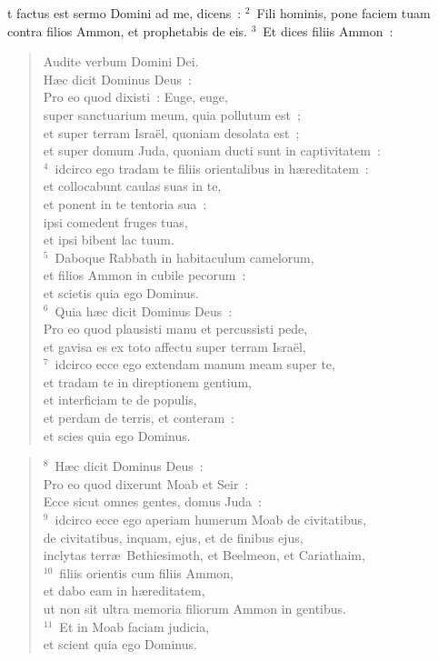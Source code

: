 \bchapter
{}t factus est sermo Domini ad me, dicens~:
${}^{2}$~Fili hominis, pone faciem tuam contra filios Ammon, et prophetabis de eis.
${}^{3}$~Et dices filiis Ammon~: \begin{flushleft}\begin{verse}Audite verbum Domini Dei.\\ H\ae c dicit Dominus Deus~:\\ Pro eo quod dixisti~: Euge, euge,\\ super sanctuarium meum, quia pollutum est~;\\ et super terram Isra\"el, quoniam desolata est~;\\ et super domum Juda, quoniam ducti sunt in captivitatem~:\\
${}^{4}$~idcirco ego tradam te filiis orientalibus in h\ae reditatem~:\\ et collocabunt caulas suas in te,\\ et ponent in te tentoria sua~:\\ ipsi comedent fruges tuas,\\ et ipsi bibent lac tuum.\\
${}^{5}$~Daboque Rabbath in habitaculum camelorum,\\ et filios Ammon in cubile pecorum~:\\ et scietis quia ego Dominus.\\
${}^{6}$~Quia h\ae c dicit Dominus Deus~:\\ Pro eo quod plausisti manu et percussisti pede,\\ et gavisa es ex toto affectu super terram Isra\"el,\\
${}^{7}$~idcirco ecce ego extendam manum meam super te,\\ et tradam te in direptionem gentium,\\ et interficiam te de populis,\\ et perdam de terris, et conteram~:\\ et scies quia ego Dominus.\end{verse}\end{flushleft}


\begin{flushleft}\begin{verse}${}^{8}$~H\ae c dicit Dominus Deus~:\\ Pro eo quod dixerunt Moab et Seir~:\\ Ecce sicut omnes gentes, domus Juda~:\\
${}^{9}$~idcirco ecce ego aperiam humerum Moab de civitatibus,\\ de civitatibus, inquam, ejus, et de finibus ejus,\\ inclytas terr\ae\ Bethiesimoth, et Beelmeon, et Cariathaim,\\
${}^{10}$~filiis orientis cum filiis Ammon,\\ et dabo eam in h\ae reditatem,\\ ut non sit ultra memoria filiorum Ammon in gentibus.\\
${}^{11}$~Et in Moab faciam judicia,\\ et scient quia ego Dominus.\end{verse}\end{flushleft}


